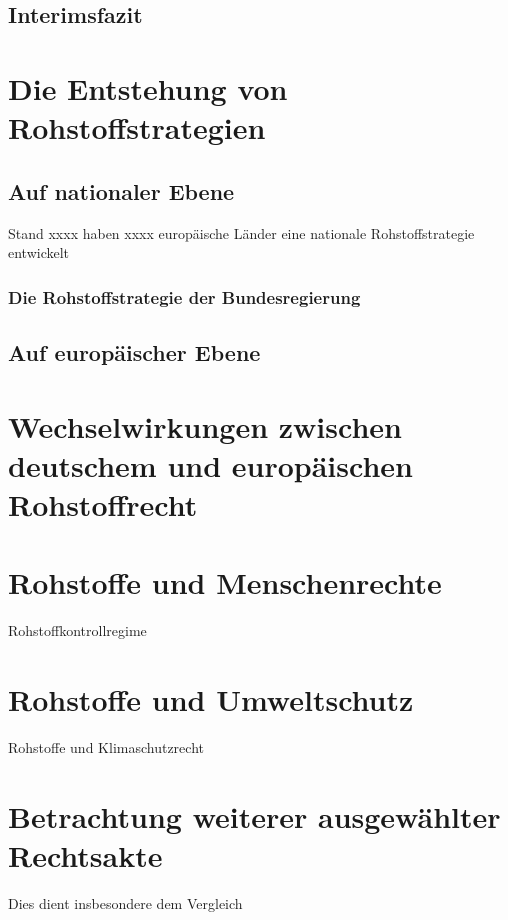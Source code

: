 \documentclass[12pt,a4paper,oneside]{book} %
\begin{document}
{	\subsection{Interimsfazit}
	
	\section{Die Entstehung von Rohstoffstrategien}
	
	\subsection{Auf nationaler Ebene}
	Stand xxxx haben xxxx europäische Länder eine nationale Rohstoffstrategie entwickelt
	
	\subsubsection{Die Rohstoffstrategie der Bundesregierung}
	
	\subsection{Auf europäischer Ebene}
	
	\section{Wechselwirkungen zwischen deutschem und europäischen Rohstoffrecht}
	
	\section{Rohstoffe und Menschenrechte}
	
	Rohstoffkontrollregime
	
	\section{Rohstoffe und Umweltschutz}
	
	Rohstoffe und Klimaschutzrecht
	
	
	\section{Betrachtung weiterer ausgewählter Rechtsakte}
	
	Dies dient insbesondere dem Vergleich 
	
}
\end{document}

